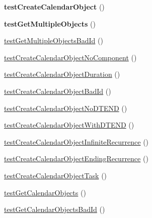 \begin{DoxyCompactItemize}
{\bfseries test\+Create\+Calendar\+Object} ()
\item 
\mbox{\label{class_sabre_1_1_cal_d_a_v_1_1_backend_1_1_abstract_p_d_o_test_a60b42053341a3170b3203f09d6b70153}} 
{\bfseries test\+Get\+Multiple\+Objects} ()
\item 
\mbox{\hyperlink{class_sabre_1_1_cal_d_a_v_1_1_backend_1_1_abstract_p_d_o_test_ac3587be7712a93cd6651881a467cf393}{test\+Get\+Multiple\+Objects\+Bad\+Id}} ()
\item 
\mbox{\hyperlink{class_sabre_1_1_cal_d_a_v_1_1_backend_1_1_abstract_p_d_o_test_a3e978ab5254a15e0c6a14ff06b7de0ed}{test\+Create\+Calendar\+Object\+No\+Component}} ()
\item 
\mbox{\hyperlink{class_sabre_1_1_cal_d_a_v_1_1_backend_1_1_abstract_p_d_o_test_abc59ce28614b4756adcb37964de00f1d}{test\+Create\+Calendar\+Object\+Duration}} ()
\item 
\mbox{\hyperlink{class_sabre_1_1_cal_d_a_v_1_1_backend_1_1_abstract_p_d_o_test_acf007ad936acfaddedcd9f37c8118d02}{test\+Create\+Calendar\+Object\+Bad\+Id}} ()
\item 
\mbox{\hyperlink{class_sabre_1_1_cal_d_a_v_1_1_backend_1_1_abstract_p_d_o_test_a42e4b77746f06a2fba452bb1aaf3a81e}{test\+Create\+Calendar\+Object\+No\+D\+T\+E\+ND}} ()
\item 
\mbox{\hyperlink{class_sabre_1_1_cal_d_a_v_1_1_backend_1_1_abstract_p_d_o_test_a4474d42670433ef6d60f7a06f0c4385d}{test\+Create\+Calendar\+Object\+With\+D\+T\+E\+ND}} ()
\item 
\mbox{\hyperlink{class_sabre_1_1_cal_d_a_v_1_1_backend_1_1_abstract_p_d_o_test_a0c1e9015dcf9bfe32f5f0c4618139a68}{test\+Create\+Calendar\+Object\+Infinite\+Recurrence}} ()
\item 
\mbox{\hyperlink{class_sabre_1_1_cal_d_a_v_1_1_backend_1_1_abstract_p_d_o_test_ae7950a7bc83260baf93b729e7230ece9}{test\+Create\+Calendar\+Object\+Ending\+Recurrence}} ()
\item 
\mbox{\hyperlink{class_sabre_1_1_cal_d_a_v_1_1_backend_1_1_abstract_p_d_o_test_a79f5add9c17d836e9e3e46e181dc9f78}{test\+Create\+Calendar\+Object\+Task}} ()
\item 
\mbox{\hyperlink{class_sabre_1_1_cal_d_a_v_1_1_backend_1_1_abstract_p_d_o_test_aa03d95930258f3e091168a0cd9441773}{test\+Get\+Calendar\+Objects}} ()
\item 
\mbox{\hyperlink{class_sabre_1_1_cal_d_a_v_1_1_backend_1_1_abstract_p_d_o_test_a36db7c8bc85dbedc23bcbeb3a845d35b}{test\+Get\+Calendar\+Objects\+Bad\+Id}} ()

\end{DoxyCompactItemize}
